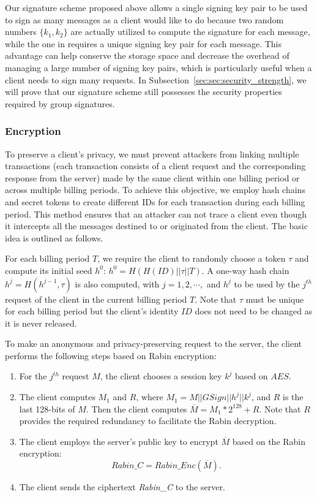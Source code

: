 \documentclass[letterpaper,12pt]{article}
\begin{document}
Our signature scheme proposed above allows a single signing key pair to be used to sign as many messages as a client would like to do because two random numbers $\{k_1, k_2\}$ are actually utilized to compute the signature for each message, while the one in \cite{chen2003new} requires a unique signing key pair for each message. This advantage can help conserve the storage space and decrease the overhead of managing a large number of signing key pairs, which is particularly useful when a client needs to sign many requests. In Subsection~\ref{sec:sec:security_strength}, we will prove that our signature scheme still possesses the security properties required by group signatures.



\subsubsection{Encryption}\label{sec:sec:encryption}
To preserve a client's privacy, we must prevent attackers from linking multiple transactions (each transaction consists of a client request and the corresponding response from the server) made by the same client within one billing period or across multiple billing periods. To achieve this objective, we employ hash chains and secret tokens to create different IDs for each transaction during each billing period. This method ensures that an attacker can not trace a client even though it intercepts all the messages destined to or originated from the client. The basic idea is outlined as follows.

For each billing period $T$, we require the client to randomly choose a token $\tau$ and compute its initial seed $h^0$: $h^0=H(H(ID)||\tau||T)$. A one-way hash chain $h^j=H(h^{j-1},\tau)$ is also computed, with $j=1, 2, \cdots,$ and $h^j$ to be used by the $j^{th}$ request of the client in the current billing period $T$. Note that $\tau$ must be unique for each billing period but the client's identity $ID$ does not need to be changed as it is never released.

To make an anonymous and privacy-preserving request to the server, the client performs the following steps based on Rabin encryption:

 \begin{enumerate}
 \item  For the $j^{th}$ request $M$, the client chooses a session key $k^j$ based on $AES$.
 \item  The client computes $M_1$ and $R$, where $M_1=M||GSign||h^j||k^j$,  and $R$ is the last 128-bits of $M$. Then the client computes $\overline{M}=M_1*2^{128}+R$. Note that $R$ provides the required redundancy to facilitate the Rabin decryption.

 \item  The client employs the server's public key to encrypt $\overline{M}$ based on the Rabin encryption:
 \begin{equation}
Rabin\_C=Rabin\_Enc(\overline{M}).
\end{equation}

 \item   The client sends the ciphertext \emph{Rabin\_C} to the server.
 \end{enumerate}
\end{document}
